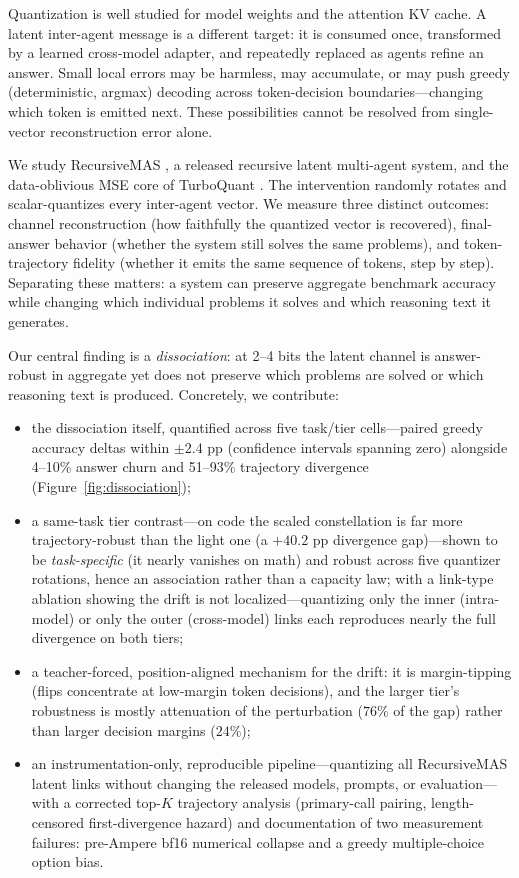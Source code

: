 \documentclass{article}
\begin{document}
Quantization is well studied for model weights and the attention KV cache. A latent
inter-agent message is a different target: it is consumed once, transformed by a
learned cross-model adapter, and repeatedly replaced as agents refine an answer.
Small local errors may be harmless, may accumulate, or may push greedy (deterministic,
argmax) decoding across token-decision boundaries---changing which token is emitted next.
These possibilities cannot be resolved from single-vector reconstruction error alone.

We study RecursiveMAS \citep{recursivemas2026}, a released recursive latent
multi-agent system, and the data-oblivious MSE core of TurboQuant
\citep{turboquant2026}. The intervention randomly rotates and scalar-quantizes every
inter-agent vector. We measure three distinct outcomes: channel reconstruction (how faithfully the
quantized vector is recovered), final-answer behavior (whether the system still solves the
same problems), and token-trajectory fidelity (whether it emits the same sequence of tokens,
step by step). Separating these matters: a system can preserve aggregate benchmark accuracy
while changing which individual problems it solves and which reasoning text it generates.

Our central finding is a \emph{dissociation}: at 2--4 bits the latent channel is
answer-robust in aggregate yet does not preserve which problems are solved or which
reasoning text is produced. Concretely, we contribute:
\begin{itemize}
  \item the dissociation itself, quantified across five task/tier cells---paired greedy
  accuracy deltas within $\pm2.4$ pp (confidence intervals spanning zero) alongside
  4--10\% answer churn and 51--93\% trajectory divergence (Figure~\ref{fig:dissociation});
  \item a same-task tier contrast---on code the scaled constellation is far more
  trajectory-robust than the light one (a $+40.2$ pp divergence gap)---shown to be
  \emph{task-specific} (it nearly vanishes on math) and robust across five quantizer
  rotations, hence an association rather than a capacity law; with a link-type ablation
  showing the drift is not localized---quantizing only the inner (intra-model) or only the
  outer (cross-model) links each reproduces nearly the full divergence on both tiers;
  \item a teacher-forced, position-aligned mechanism for the drift: it is margin-tipping (flips
  concentrate at low-margin token decisions), and the larger tier's robustness is mostly
  attenuation of the perturbation ($76\%$ of the gap) rather than larger decision margins ($24\%$);
  \item an instrumentation-only, reproducible pipeline---quantizing all RecursiveMAS latent links
  without changing the released models, prompts, or evaluation---with a corrected top-$K$
  trajectory analysis (primary-call pairing, length-censored first-divergence hazard) and
  documentation of two measurement failures: pre-Ampere bf16 numerical collapse and a greedy
  multiple-choice option bias.
\end{itemize}
\end{document}
